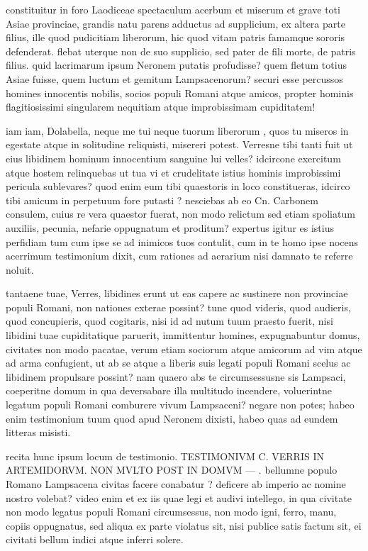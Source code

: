  constituitur in foro Laodiceae spectaculum acerbum et miserum et grave toti Asiae provinciae, grandis natu parens adductus ad supplicium, ex altera parte filius, ille quod pudicitiam liberorum, hic quod vitam patris famamque sororis defenderat. flebat uterque non de suo supplicio, sed pater de fili morte, de patris filius. quid lacrimarum ipsum Neronem putatis profudisse? quem fletum totius Asiae fuisse, quem luctum et gemitum Lampsacenorum? securi esse percussos homines innocentis nobilis, socios populi Romani atque amicos, propter hominis flagitiosissimi singularem nequitiam atque improbissimam cupiditatem!

 iam iam, Dolabella, neque me tui neque tuorum liberorum , quos tu miseros in egestate atque in solitudine reliquisti, misereri potest. Verresne tibi tanti fuit ut eius libidinem hominum innocentium sanguine lui velles? idcircone exercitum atque hostem relinquebas ut tua vi et crudelitate istius hominis improbissimi pericula sublevares? quod enim eum tibi quaestoris in loco constitueras, idcirco tibi amicum in perpetuum fore putasti ? nesciebas ab eo Cn. Carbonem consulem, cuius re vera quaestor fuerat, non modo relictum sed etiam spoliatum auxiliis, pecunia, nefarie oppugnatum et proditum? expertus igitur es istius perfidiam tum cum ipse se ad inimicos tuos contulit, cum in te homo ipse nocens acerrimum testimonium dixit, cum rationes ad aerarium nisi damnato te referre noluit.

 tantaene tuae, Verres, libidines erunt ut eas capere ac sustinere non provinciae populi Romani, non nationes exterae possint? tune quod videris, quod audieris, quod concupieris, quod cogitaris, nisi id ad nutum tuum praesto fuerit, nisi libidini tuae cupiditatique paruerit, immittentur homines, expugnabuntur domus, civitates non modo pacatae, verum etiam sociorum atque amicorum ad vim atque ad arma confugient, ut ab se atque a liberis suis legati populi Romani scelus ac libidinem propulsare possint? nam quaero abs te circumsessusne sis Lampsaci, coeperitne domum in qua deversabare illa multitudo incendere, voluerintne legatum populi Romani comburere vivum Lampsaceni? negare non potes; habeo enim testimonium tuum quod apud Neronem dixisti, habeo quas ad eundem litteras misisti.

 recita hunc ipsum locum de testimonio. TESTIMONIVM C. VERRIS IN ARTEMIDORVM. NON MVLTO POST IN DOMVM — . bellumne populo Romano Lampsacena civitas facere conabatur ? deficere ab imperio ac nomine nostro volebat? video enim et ex iis quae legi et audivi intellego, in qua civitate non modo legatus populi Romani circumsessus, non modo igni, ferro, manu, copiis oppugnatus, sed aliqua ex parte violatus sit, nisi publice satis factum sit, ei civitati bellum indici atque inferri solere.

